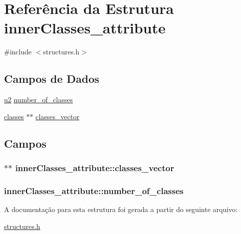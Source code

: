 \hypertarget{structinnerClasses__attribute}{}\section{Referência da Estrutura inner\+Classes\+\_\+attribute}
\label{structinnerClasses__attribute}


{\ttfamily \#include $<$structures.\+h$>$}

\subsection*{Campos de Dados}
\begin{DoxyCompactItemize}
\item 
\hyperlink{lista__operandos_8h_a732cde1300aafb73b0ea6c2558a7a54f}{u2} \hyperlink{structinnerClasses__attribute_a5025605be4999db69f5cf0309fa1e443}{number\+\_\+of\+\_\+classes}
\item 
\hyperlink{structclasses}{classes} $\ast$$\ast$ \hyperlink{structinnerClasses__attribute_a0179ecaaf1ae3febfc8553dcfb278679}{classes\+\_\+vector}
\end{DoxyCompactItemize}


\subsection{Campos}
\subsubsection[{\texorpdfstring{classes\+\_\+vector}{classes_vector}}]{$\ast$$\ast$ inner\+Classes\+\_\+attribute\+::classes\+\_\+vector}\hypertarget{structinnerClasses__attribute_a0179ecaaf1ae3febfc8553dcfb278679}{}\label{structinnerClasses__attribute_a0179ecaaf1ae3febfc8553dcfb278679}
\subsubsection[{\texorpdfstring{number\+\_\+of\+\_\+classes}{number_of_classes}}]{ inner\+Classes\+\_\+attribute\+::number\+\_\+of\+\_\+classes}\hypertarget{structinnerClasses__attribute_a5025605be4999db69f5cf0309fa1e443}{}\label{structinnerClasses__attribute_a5025605be4999db69f5cf0309fa1e443}


A documentação para esta estrutura foi gerada a partir do seguinte arquivo\+:\begin{DoxyCompactItemize}
\item 
\hyperlink{structures_8h}{structures.\+h}\end{DoxyCompactItemize}
